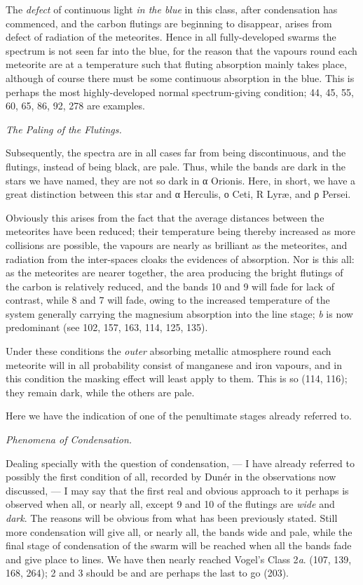 \documentclass[a4paper, 12pt, oneside, polutonikogreek, english]{article}
\begin{document}
The \emph{defect} of continuous light \emph{in the blue} in this class, after condensation has commenced, and the carbon flutings are beginning to disappear, arises from defect of radiation of the meteorites. Hence in all fully-developed swarms the spectrum is not seen far into the blue, for the reason that the vapours round each meteorite are at a temperature such that fluting absorption mainly takes place, although of course there must be some continuous absorption in the blue. This is perhaps the most highly-developed normal spectrum-giving condition; 44, 45, 55, 60, 65, 86, 92, 278 are examples.

\emph{The Paling of the Flutings.}

Subsequently, the spectra are in all cases far from being discontinuous, and the flutings, instead of being black, are pale. Thus, while the bands are dark in the stars we have named, they are not so dark in α Orionis. Here, in short, we have a great distinction between this star and α Herculis, ο Ceti, R Lyræ, and ρ Persei.

Obviously this arises from the fact that the average distances between the meteorites have been reduced; their temperature being thereby increased as more collisions are possible, the vapours are nearly as brilliant as the meteorites, and radiation from the inter-spaces cloaks the evidences of absorption. Nor is this all: as the meteorites are nearer together, the area producing the bright flutings of the carbon is relatively reduced, and the bands 10 and 9 will fade for lack of contrast, while 8 and 7 will fade, owing to the increased temperature of the system generally carrying the magnesium absorption into the line stage; \emph{b} is now predominant (see 102, 157, 163, 114, 125, 135).

Under these conditions the \emph{outer} absorbing metallic atmosphere round each meteorite will in all probability consist of manganese and iron vapours, and in this condition the masking effect will least apply to them. This is so (114, 116); they remain dark, while the others are pale.

Here we have the indication of one of the penultimate stages already referred to.

\emph{Phenomena of Condensation.}

Dealing specially with the question of condensation, --- I have already referred to possibly the first condition of all, recorded by Dunér in the observations now discussed, --- I may say that the first real and obvious approach to it perhaps is observed when all, or nearly all, except 9 and 10 of the flutings are \emph{wide} and \emph{dark}. The reasons will be obvious from what has been previously stated. Still more condensation will give all, or nearly all, the bands wide and pale, while the final stage of condensation of the swarm will be reached when all the bands fade and give place to lines. We have then nearly reached Vogel's Class 2\emph{a}. (107, 139, 168, 264); 2 and 3 should be and are perhaps the last to go (203).
\end{document}
